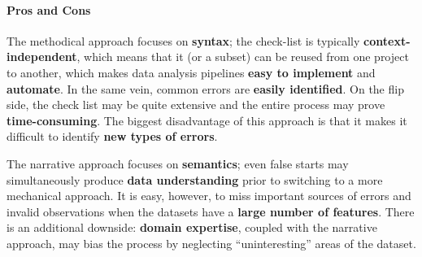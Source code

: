 \paragraph{Pros and Cons}
The methodical approach focuses on  \textbf{syntax}; the check-list is typically \textbf{context-independent}, which means that it (or a subset) can be reused from one project to another, which makes data analysis pipelines \textbf{easy to implement} and \textbf{automate}. In the same vein, common errors are \textbf{easily identified}. On the flip side, the check list may be quite extensive and the entire process may prove \textbf{time-consuming}. The biggest disadvantage of this approach is that it makes it difficult to identify \textbf{new types of errors}.\par
The narrative approach focuses on \textbf{semantics}; even false starts may simultaneously produce \textbf{data understanding} prior to switching to a more mechanical approach. It is easy, however, to miss important sources of errors and invalid observations when the datasets have a \textbf{large number of features}. There is an additional downside: \textbf{domain expertise}, coupled with the narrative approach,  may bias the process by neglecting ``uninteresting'' areas of the dataset.
